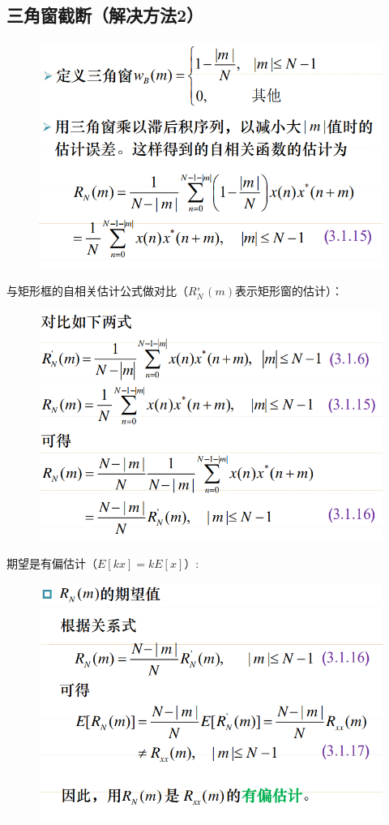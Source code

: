 \documentclass[UTF8]{ctexart} %
\begin{document}
			\subsection{三角窗截断（解决方法2）}
				\begin{figure}[H]
					\centering\includegraphics[scale=0.4]{85.png}
				\end{figure}
				与矩形框的自相关估计公式做对比（$R^，_N(m)$表示矩形窗的估计）：
				\begin{figure}[H]
					\centering\includegraphics[scale=0.4]{86.png}
				\end{figure}
				期望是有偏估计（$E[kx]=kE[x]$）:
				\begin{figure}[H]
					\centering\includegraphics[scale=0.4]{87.png}
				\end{figure}
\end{document}
